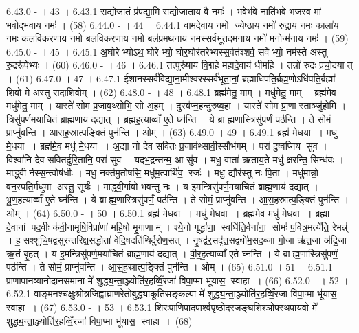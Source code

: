 6.43.0
- । 43 ।
6.43.1
स॒द्योजा॒तं प्र॑पद्या॒मि॒ स॒द्योजा॒ताय॒ वै नमः॑ । भ॒वेभ॑वे॒ नाति॑भवे भजस्व॒ मां भ॒वोद्भ॑वाय॒ नमः॑ । (58)
6.44.0
- । 44 ।
6.44.1
वा॒म॒दे॒वाय॒ नमो ज्ये॒ष्ठाय॒ नमो॑ रु॒द्राय॒ नमः॒ काला॑य॒ नमः॒ कल॑विकरणाय॒ नमो॒ बल॑विकरणाय॒ नमो॒ बल॑प्रमथनाय॒ नम॒स्सर्व॑भूतदमनाय॒ नमो॑ म॒नोन्म॑नाय॒ नमः॑ । (59)
6.45.0
- । 45 ।
6.45.1
अ॒घोरेभ्योऽथ॒ घोरेभ्यो॒ घोर॒घोर॑तरेभ्यस्स॒र्वत॑श्शर्व॒ सर्वेभ्यो॒ नम॑स्ते अस्तु रु॒द्ररू॑पेभ्यः । (60)
6.46.0
- । 46 ।
6.46.1
तत्पुरु॑षाय वि॒द्महे॑ महादे॒वाय॑ धीमहि । तन्नो॑ रुद्रः प्रचो॒दयात् । (61)
6.47.0
। 47 ।
6.47.1
ईशानस्सर्व॑विद्या॒ना॒मीश्वरस्सर्व॑भूता॒नां॒ ब्रह्माधि॑पति॒र्ब्रह्म॒णोऽधि॑पति॒र्ब्रह्मा॑ शि॒वो मे॑ अस्तु सदाशि॒वोम् । (62)
6.48.0
- । 48 ।
6.48.1
ब्रह्म॑मेतु॒ माम् । मधु॑मेतु॒ माम् । ब्रह्म॑मे॒व मधु॑मेतु॒ माम् । यास्ते॑ सोम प्र॒जाव॒थ्सोभि॒ सो अ॒हम् । दुस्व॑प्न॒हन्दु॑रुष्व॒हा । यास्ते॑ सोम प्रा॒णास्ताञ्जु॑होमि । त्रिसु॑पर्ण॒मया॑चितं ब्राह्म॒णाय॑ दद्यात् । ब्र॒ह्म॒ह॒त्याव्वाँ ए॒ते घ्न॑न्ति । ये ब्राह्म॒णास्त्रिसु॑पर्णं॒ पठ॑न्ति । ते सोमं॒ प्राप्नु॑वन्ति । आ॒स॒ह॒स्रात्प॒ङ्क्तिं पुन॑न्ति । ओम् । (63)
6.49.0
। 49 ।
6.49.1
ब्रह्म॑ मे॒धया । मधु॑ मे॒धया । ब्रह्म॑मे॒व मधु॑ मे॒धया । अ॒द्या नो॑ देव सवितः प्र॒जाव॑थ्सावी॒स्सौभ॑गम् । परा॑ दु॒ष्वप्नि॑य सुव । विश्वा॑नि देव सवितर्दुरि॒तानि॒ परा॑ सुव । यद्भ॒द्रन्तन्म॒ आ सु॑व । मधु॒ वाता॑ ऋताय॒ते मधु॑ क्षरन्ति॒ सिन्ध॑वः । माद्ध्वीर्नस्स॒न्त्वोष॑धीः । मधु॒ नक्त॑मु॒तोषसि॒ मधु॑म॒त्पार्थि॑व॒॒ रजः॑ । मधु॒ द्यौर॑स्तु नः पि॒ता । मधु॑मान्नो॒ वन॒स्पति॒र्मधु॑मा अस्तु॒ सूर्यः॑ । माद्ध्वी॒र्गावो॑ भवन्तु नः । य इ॒मन्त्रिसु॑पर्ण॒मया॑चितं ब्राह्म॒णाय॑ दद्यात् । भ्रू॒ण॒ह॒त्याव्वाँ ए॒ते घ्न॑न्ति । ये ब्राह्म॒णास्त्रिसु॑पर्णं॒ पठ॑न्ति । ते सोमं॒ प्राप्नु॑वन्ति । आ॒स॒ह॒स्रात्प॒ङ्क्तिं पुन॑न्ति । ओम् । (64)
6.50.0
- । 50 ।
6.50.1
ब्रह्म॑ मे॒धवा । मधु॑ मे॒धवा । ब्रह्म॑मे॒व मधु॑ मे॒धवा । ब्र॒ह्मा दे॒वानां पद॒वीः क॑वी॒नामृषि॒र्विप्रा॑णां महि॒षो मृ॒गाणाम् । श्ये॒नो गृद्ध्रा॑णा॒॒ स्वधि॑ति॒र्वना॑ना॒॒ सोमः॑ प॒वित्र॒मत्ये॑ति॒ रेभन्न्॑ । ह॒॒सश्शु॑चि॒षद्वसु॑रन्तरिक्ष॒सद्धोता॑ वेदि॒षदति॑थिर्दुरोण॒सत् । नृ॒षद्व॑र॒सदृ॑त॒सद्व्यो॑म॒सद॒ब्जा गो॒जा ऋ॑त॒जा अ॑द्रि॒जा ऋ॒तं बृ॒हत् । य इ॒मन्त्रिसु॑पर्ण॒मया॑चितं ब्राह्म॒णाय॑ दद्यात् । वी॒र॒ह॒त्याव्वाँ ए॒ते घ्न॑न्ति । ये ब्राह्म॒णास्त्रिसु॑पर्णं॒ पठ॑न्ति । ते सोमं॒ प्राप्नु॑वन्ति । आ॒स॒ह॒स्रात्प॒ङ्क्तिं पुन॑न्ति । ओम् । (65)
6.51.0
। 51 ।
6.51.1
प्राणापानव्यानोदानसमाना मे॑ शुद्ध्य॒न्ता॒ञ्ज्योति॑र॒हव्विँ॒रजा॑ विपा॒प्मा भू॑यास॒॒ स्वाहा । (66)
6.52.0
- । 52 ।
6.52.1
वाङ्मनश्चक्षुःश्रोत्रजिह्वाघ्राणरेतोबुद्ध्याकूतिसङ्कल्पा मे॑ शुद्ध्य॒न्ता॒ञ्ज्योति॑र॒हव्विँ॒रजा॑ विपा॒प्मा भू॑यास॒॒ स्वाहा । (67)
6.53.0
- । 53 ।
6.53.1
शिरःपाणिपादपार्श्वपृष्ठोदरजङ्घशिश्ञोपस्थपायवो मे॑ शुद्ध्य॒न्ता॒ञ्ज्योति॑र॒हव्विँ॒रजा॑ विपा॒प्मा भू॑यास॒॒ स्वाहा । (68)

